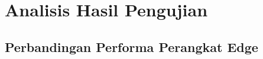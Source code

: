 
\section{Analisis Hasil Pengujian}
\label{sec:analisis}


\subsection{Perbandingan Performa Perangkat Edge}



